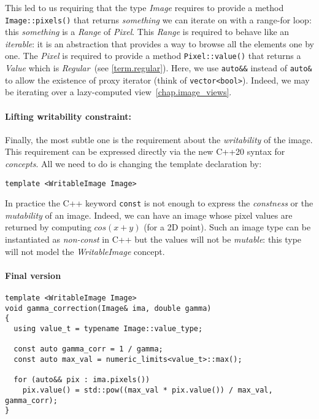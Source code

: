 \noindent This led to us requiring that the type \emph{Image} requires to provide a method \texttt{Image::pixels()} that
returns \emph{something} we can iterate on with a range-for loop: this \emph{something} is a \emph{Range} of
\emph{Pixel}. This \emph{Range} is required to behave like an \emph{iterable}: it is an abstraction that provides a way
to browse all the elements one by one. The \emph{Pixel} is required to provide a method \texttt{Pixel::value()} that
returns a \emph{Value} which is \emph{Regular}~(see \cref{term.regular}). Here, we use \texttt{auto\&\&} instead of
\texttt{auto\&} to allow the existence of proxy iterator (think of \texttt{vector<bool>}). Indeed, we may be iterating
over a lazy-computed view~\cref{chap.image_views}.



\paragraph{Lifting writability constraint:}
Finally, the most subtle one is the requirement about the \emph{writability} of the image. This requirement can be
expressed directly via the new C++20 syntax for \emph{concepts}. All we need to do is changing the template declaration
by:

\begin{verbatim}
template <WritableImage Image>
\end{verbatim}

\noindent In practice the C++ keyword \texttt{const} is not enough to express the \emph{constness} or the
\emph{mutability} of an image. Indeed, we can have an image whose pixel values are returned by computing $cos(x+y)$ (for
a 2D point). Such an image type can be instantiated as \emph{non-const} in C++ but the values will not be
\emph{mutable}: this type will not model the \emph{WritableImage} concept.



\paragraph{Final version}

\begin{verbatim}
template <WritableImage Image>
void gamma_correction(Image& ima, double gamma)
{
  using value_t = typename Image::value_type;

  const auto gamma_corr = 1 / gamma;
  const auto max_val = numeric_limits<value_t>::max();

  for (auto&& pix : ima.pixels())
    pix.value() = std::pow((max_val * pix.value()) / max_val, gamma_corr);
}
\end{verbatim}

